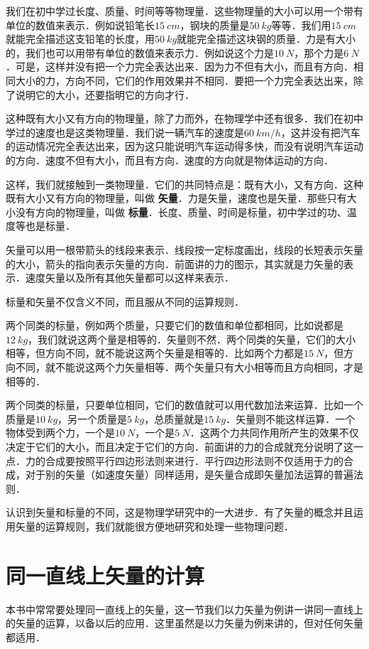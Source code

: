 我们在初中学过长度、质量、时间等等物理量．这些物理量的大小可以用一个带有单位的数值来表示．例如说铅笔长$\qty{15}{cm}$，钢块的质量是$\qty{50}{kg}$等等．我们用$\qty{15}{cm}$就能完全描述这支铅笔的长度，用$\qty{50}{kg}$就能完全描述这块钢的质量．力是有大小的，我们也可以用带有单位的数值来表示力．例如说这个力是$\qty{10}{N}$，那个力是$\qty{6}{N}$．可是，这样并没有把一个力完全表达出来．因为力不但有大小，而且有方向．相同大小的力，方向不同，它们的作用效果并不相同．要把一个力完全表达出来，除了说明它的大小，还要指明它的方向才行．

这种既有大小又有方向的物理量，除了力而外，在物理学中还有很多．我们在初中学过的速度也是这类物理量．我们说一辆汽车的速度是$\qty{60}{km/h}$，这并没有把汽车的运动情况完全表达出来，因为这只能说明汽车运动得多快，而没有说明汽车运动的方向．速度不但有大小，而且有方向．速度的方向就是物体运动的方向．

这样，我们就接触到一类物理量．它们的共同特点是：既有大小，又有方向．这种既有大小又有方向的物理量，叫做\textbf{ 矢量}．力是矢量，速度也是矢量．那些只有大小没有方向的物理量，叫做\textbf{ 标量}．长度、质量、时间是标量，初中学过的功、温度等也是标量．

矢量可以用一根带箭头的线段来表示．线段按一定标度画出，线段的长短表示矢量的大小，箭头的指向表示矢量的方向．前面讲的力的图示，其实就是力矢量的表示．速度矢量以及所有其他矢量都可以这样来表示．

标量和矢量不仅含义不同，而且服从不同的运算规则．

两个同类的标量，例如两个质量，只要它们的数值和单位都相同，比如说都是$\qty{12}{kg}$，我们就说这两个量是相等的．矢量则不然．两个同类的矢量，它们的大小相等，但方向不同，就不能说这两个矢量是相等的．比如两个力都是$\qty{15}{N}$，但方向不同，就不能说这两个力矢量相等．两个矢量只有大小相等而且方向相同，才是相等的．

两个同类的标量，只要单位相同，它们的数值就可以用代数加法来运算．比如一个质量是$\qty{10}{kg}$，另一个质量是$\qty{5}{kg}$，总质量就是$\qty{15}{kg}$．矢量则不能这样运算．一个物体受到两个力，一个是$\qty{10}{N}$，一个是$\qty{5}{N}$．这两个力共同作用所产生的效果不仅决定于它们的大小，而且决定于它们的方向．前面讲的力的合成就充分说明了这一点．力的合成要按照平行四边形法则来进行．平行四边形法则不仅适用于力的合成，对于别的矢量（如速度矢量）同样适用，是矢量合成即矢量加法运算的普遍法则．

认识到矢量和标量的不同，这是物理学研究中的一大进步．有了矢量的概念并且运用矢量的运算规则，我们就能很方便地研究和处理一些物理问题．

\newpage

\section{同一直线上矢量的计算}
本书中常常要处理同一直线上的矢量，这一节我们以力矢量为例讲一讲同一直线上的矢量的运算，以备以后的应用．这里虽然是以力矢量为例来讲的，但对任何矢量都适用．

